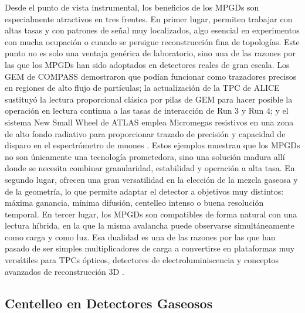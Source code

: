 \documentclass[12pt,a4paper]{article}
\begin{document}
Desde el punto de vista instrumental, los beneficios de los MPGDs son especialmente atractivos en tres frentes. En primer lugar, permiten trabajar con altas tasas y con patrones de señal muy localizados, algo esencial en experimentos con mucha ocupación o cuando se persigue reconstrucción fina de topologías. Este punto no es solo una ventaja genérica de laboratorio, sino una de las razones por las que los MPGDs han sido adoptados en detectores reales de gran escala. Los GEM de COMPASS demostraron que podían funcionar como trazadores precisos en regiones de alto flujo de partículas; la actualización de la TPC de ALICE sustituyó la lectura proporcional clásica por pilas de GEM para hacer posible la operación en lectura continua a las tasas de interacción de Run 3 y Run 4; y el sistema New Small Wheel de ATLAS emplea Micromegas resistivos en una zona de alto fondo radiativo para proporcionar trazado de precisión y capacidad de disparo en el espectrómetro de muones \cite{ketzer2004compass,adolfsson2021alice,manthos2019atlas}. Estos ejemplos muestran que los MPGDs no son únicamente una tecnología prometedora, sino una solución madura allí donde se necesita combinar granularidad, estabilidad y operación a alta tasa. En segundo lugar, ofrecen una gran versatilidad en la elección de la mezcla gaseosa y de la geometría, lo que permite adaptar el detector a objetivos muy distintos: máxima ganancia, mínima difusión, centelleo intenso o buena resolución temporal. En tercer lugar, los MPGDs son compatibles de forma natural con una lectura híbrida, en la que la misma avalancha puede observarse simultáneamente como carga y como luz. Esa dualidad es una de las razones por las que han pasado de ser simples multiplicadores de carga a convertirse en plataformas muy versátiles para TPCs ópticos, detectores de electroluminiscencia y conceptos avanzados de reconstrucción 3D \cite{oliveira2012simulation,williams2024fatgems}.

\subsection{Centelleo en Detectores Gaseosos}
\end{document}
